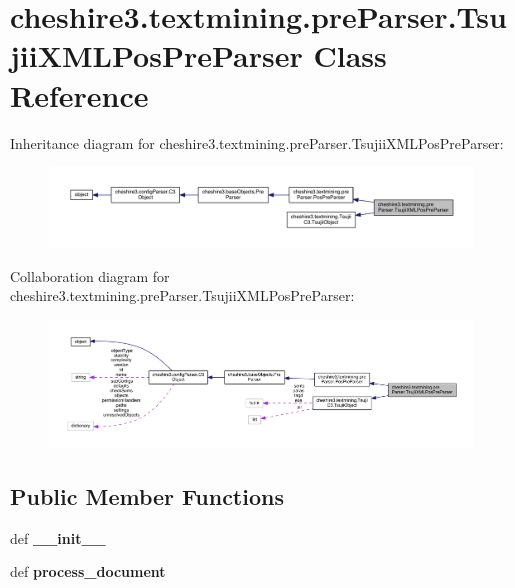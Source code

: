 \hypertarget{classcheshire3_1_1textmining_1_1pre_parser_1_1_tsujii_x_m_l_pos_pre_parser}{\section{cheshire3.\-textmining.\-pre\-Parser.\-Tsujii\-X\-M\-L\-Pos\-Pre\-Parser Class Reference}
\label{classcheshire3_1_1textmining_1_1pre_parser_1_1_tsujii_x_m_l_pos_pre_parser}
}


Inheritance diagram for cheshire3.\-textmining.\-pre\-Parser.\-Tsujii\-X\-M\-L\-Pos\-Pre\-Parser\-:
\nopagebreak
\begin{figure}[H]
\begin{center}
\leavevmode
\includegraphics[width=350pt]{classcheshire3_1_1textmining_1_1pre_parser_1_1_tsujii_x_m_l_pos_pre_parser__inherit__graph}
\end{center}
\end{figure}


Collaboration diagram for cheshire3.\-textmining.\-pre\-Parser.\-Tsujii\-X\-M\-L\-Pos\-Pre\-Parser\-:
\nopagebreak
\begin{figure}[H]
\begin{center}
\leavevmode
\includegraphics[width=350pt]{classcheshire3_1_1textmining_1_1pre_parser_1_1_tsujii_x_m_l_pos_pre_parser__coll__graph}
\end{center}
\end{figure}
\subsection*{Public Member Functions}
\begin{DoxyCompactItemize}
\item 
\hypertarget{classcheshire3_1_1textmining_1_1pre_parser_1_1_tsujii_x_m_l_pos_pre_parser_a46636bc39f13405942b172fd41e2512a}{def {\bfseries \-\_\-\-\_\-init\-\_\-\-\_\-}}\label{classcheshire3_1_1textmining_1_1pre_parser_1_1_tsujii_x_m_l_pos_pre_parser_a46636bc39f13405942b172fd41e2512a}

\item 
\hypertarget{classcheshire3_1_1textmining_1_1pre_parser_1_1_tsujii_x_m_l_pos_pre_parser_a1e7a46f456d9e53b746ab9814c5e9ddf}{def {\bfseries process\-\_\-document}}\label{classcheshire3_1_1textmining_1_1pre_parser_1_1_tsujii_x_m_l_pos_pre_parser_a1e7a46f456d9e53b746ab9814c5e9ddf}

\end{DoxyCompactItemize}
